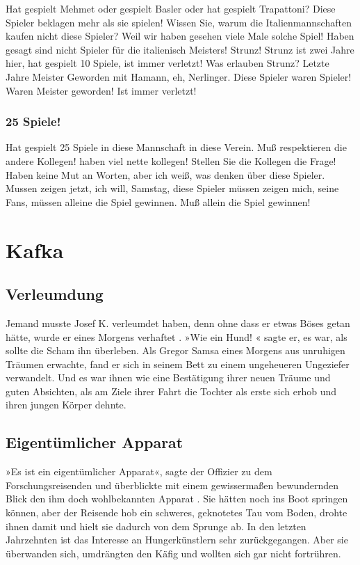 \documentclass[ngerman, 11pt, a4paper]{article}
\begin{document}
  Hat gespielt Mehmet oder gespielt Basler oder hat gespielt Trapattoni? Diese Spieler beklagen mehr als sie spielen! Wissen Sie, warum die Italienmannschaften kaufen nicht diese Spieler? Weil wir haben gesehen viele Male solche Spiel! Haben gesagt sind nicht Spieler für die italienisch Meisters! Strunz! Strunz ist zwei Jahre hier, hat gespielt 10 Spiele, ist immer verletzt! Was erlauben Strunz? Letzte Jahre Meister Geworden mit Hamann, eh, Nerlinger. Diese Spieler waren Spieler! Waren Meister geworden! Ist immer verletzt!
  
  \subsubsection{25 Spiele!}
  
   Hat gespielt 25 Spiele in diese Mannschaft in diese Verein. Muß respektieren die andere Kollegen! haben viel nette kollegen! Stellen Sie die Kollegen die Frage! Haben keine Mut an Worten, aber ich weiß, was denken über diese Spieler. Mussen zeigen jetzt, ich will, Samstag, diese Spieler müssen zeigen mich, seine Fans, müssen alleine die Spiel gewinnen. Muß allein die Spiel gewinnen!
   
\section{Kafka}

\subsection{Verleumdung}

Jemand musste Josef K. verleumdet haben, denn ohne dass er etwas Böses getan hätte, wurde er eines Morgens verhaftet \parencite{mitrednf2021}. »Wie ein Hund! « sagte er, es war, als sollte die Scham ihn überleben. Als Gregor Samsa eines Morgens aus unruhigen Träumen erwachte, fand er sich in seinem Bett zu einem ungeheueren Ungeziefer verwandelt. Und es war ihnen wie eine Bestätigung ihrer neuen Träume und guten Absichten, als am Ziele ihrer Fahrt die Tochter als erste sich erhob und ihren jungen Körper dehnte.

\subsection{Eigentümlicher Apparat}

 »Es ist ein eigentümlicher Apparat«, sagte der Offizier zu dem Forschungsreisenden und überblickte mit einem gewissermaßen bewundernden Blick den ihm doch wohlbekannten Apparat \parencite{syme2011f}. Sie hätten noch ins Boot springen können, aber der Reisende hob ein schweres, geknotetes Tau vom Boden, drohte ihnen damit und hielt sie dadurch von dem Sprunge ab. In den letzten Jahrzehnten ist das Interesse an Hungerkünstlern sehr zurückgegangen. Aber sie überwanden sich, umdrängten den Käfig und wollten sich gar nicht fortrühren. 
 
\end{document}
